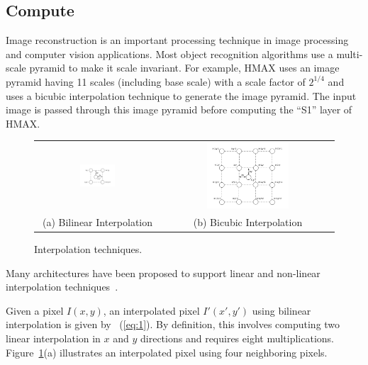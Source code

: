 \subsection{Compute}
Image reconstruction is an important processing technique in image processing and computer vision applications. Most object recognition algorithms use a multi-scale 
pyramid to make it scale invariant. For example, HMAX uses an image pyramid having 11 scales (including base scale) with a scale factor of $2^{1/4}$ and 
uses a bicubic interpolation technique 
to generate the image pyramid. The input image is passed through this image pyramid before computing the ``S1'' layer of HMAX. 

\begin{figure}[!htb]
\centering
\begin{tabular}{@{}c@{} @{}c@{}}
\includegraphics[width=0.3\textwidth]{./figures/bilinear.pdf} & \includegraphics[width=0.5\textwidth]{./figures/bicubic.pdf}\\[\abovecaptionskip]
\small (a) Bilinear Interpolation & \small (b) Bicubic Interpolation
\end{tabular}
\vspace{1pt}
\caption{Interpolation techniques.}
\label{tab:interpolation}
\end{figure}

Many architectures have been proposed to support linear 
and non-linear interpolation techniques~\cite{kesturdac}.

Given a pixel $I(x,y)$, an interpolated pixel $I'(x',y')$ using bilinear interpolation is given by ~(\ref{eq:1}). By definition, 
this involves computing two linear interpolation in $x$ and $y$ directions and requires eight multiplications. 
Figure~\ref{tab:interpolation}(a) illustrates an interpolated pixel using four neighboring pixels.

